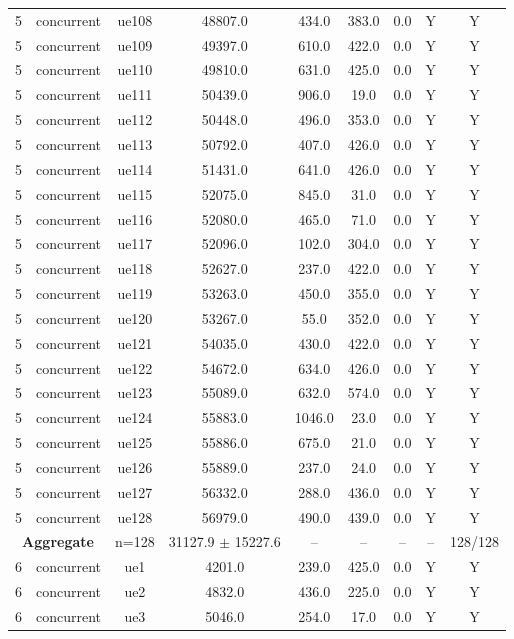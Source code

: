 \begin{table}[ht]
\begin{tabular}{|c|c|c|c|c|c|c|c|c|}
5 & concurrent & ue108 & 48807.0 & 434.0 & 383.0 & 0.0 & Y & Y \\
5 & concurrent & ue109 & 49397.0 & 610.0 & 422.0 & 0.0 & Y & Y \\
5 & concurrent & ue110 & 49810.0 & 631.0 & 425.0 & 0.0 & Y & Y \\
5 & concurrent & ue111 & 50439.0 & 906.0 & 19.0 & 0.0 & Y & Y \\
5 & concurrent & ue112 & 50448.0 & 496.0 & 353.0 & 0.0 & Y & Y \\
5 & concurrent & ue113 & 50792.0 & 407.0 & 426.0 & 0.0 & Y & Y \\
5 & concurrent & ue114 & 51431.0 & 641.0 & 426.0 & 0.0 & Y & Y \\
5 & concurrent & ue115 & 52075.0 & 845.0 & 31.0 & 0.0 & Y & Y \\
5 & concurrent & ue116 & 52080.0 & 465.0 & 71.0 & 0.0 & Y & Y \\
5 & concurrent & ue117 & 52096.0 & 102.0 & 304.0 & 0.0 & Y & Y \\
5 & concurrent & ue118 & 52627.0 & 237.0 & 422.0 & 0.0 & Y & Y \\
5 & concurrent & ue119 & 53263.0 & 450.0 & 355.0 & 0.0 & Y & Y \\
5 & concurrent & ue120 & 53267.0 & 55.0 & 352.0 & 0.0 & Y & Y \\
5 & concurrent & ue121 & 54035.0 & 430.0 & 422.0 & 0.0 & Y & Y \\
5 & concurrent & ue122 & 54672.0 & 634.0 & 426.0 & 0.0 & Y & Y \\
5 & concurrent & ue123 & 55089.0 & 632.0 & 574.0 & 0.0 & Y & Y \\
5 & concurrent & ue124 & 55883.0 & 1046.0 & 23.0 & 0.0 & Y & Y \\
5 & concurrent & ue125 & 55886.0 & 675.0 & 21.0 & 0.0 & Y & Y \\
5 & concurrent & ue126 & 55889.0 & 237.0 & 24.0 & 0.0 & Y & Y \\
5 & concurrent & ue127 & 56332.0 & 288.0 & 436.0 & 0.0 & Y & Y \\
5 & concurrent & ue128 & 56979.0 & 490.0 & 439.0 & 0.0 & Y & Y \\
\multicolumn{2}{|c|}{\textbf{Aggregate}} & n=128 & 31127.9 $\pm$ 15227.6 & -- & -- & -- & -- & 128/128 \\
\hline
6 & concurrent & ue1 & 4201.0 & 239.0 & 425.0 & 0.0 & Y & Y \\
6 & concurrent & ue2 & 4832.0 & 436.0 & 225.0 & 0.0 & Y & Y \\
6 & concurrent & ue3 & 5046.0 & 254.0 & 17.0 & 0.0 & Y & Y \\

\end{tabular}
\end{table}
